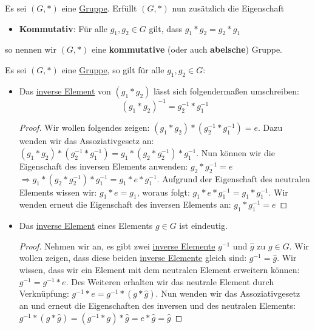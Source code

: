 \documentclass[../../main.tex]{subfiles}
\begin{document}
		\begin{definition}
			\label{def:kommutativeGruppe}
			\label{def:abelscheGruppe}
			Es sei $(G,*)$ eine \hyperref[def:Gruppe]{Gruppe}. Erfüllt $(G,*)$ nun zusätzlich die Eigenschaft 
			\begin{itemize}
				\item \textbf{Kommutativ}: Für alle $g_1,g_2 \in G$ gilt, dass $g_1 * g_2 = g_2 * g_1$
			\end{itemize}
			so nennen wir $(G,*)$ eine \textbf{kommutative} (oder auch \textbf{abelsche}) Gruppe. 
		\end{definition}
	
		\begin{theorem}
			Es sei $(G,*)$ eine \hyperref[def:Gruppe]{Gruppe}, so gilt für alle $g_1,g_2\in G$:
			\begin{itemize}
				\item Das \hyperref[def:inversesElement]{inverse Element} von $(g_1*g_2)$ lässt sich folgendermaßen umschreiben:  $$(g_1*g_2)^{-1}=g_2^{-1}*g_1^{-1}$$
				\begin{proof}
					Wir wollen folgendes zeigen: $(g_1*g_2)*(g_2^{-1}*g_1^{-1})=e$. Dazu wenden wir das Assoziativgesetz an: $(g_1*g_2)*(g_2^{-1}*g_1^{-1})=g_1 * (g_2*g_2^{-1}) * g_1^{-1}$. Nun können wir die Eigenschaft des inversen Elements anwenden: $g_2*g_2^{-1}=e$ $\Rightarrow g_1 * (g_2*g_2^{-1}) * g_1^{-1} = g_1 * e * g_1^{-1}$. Aufgrund der Eigenschaft des neutralen Elements wissen wir: $g_1 * e = g_1$, woraus folgt: $g_1 * e * g_1^{-1} = g_1 * g_1^{-1}$. Wir wenden erneut die Eigenschaft des inversen Elements an: $g_1 * g_1^{-1} = e$
				\end{proof}
				\item Das \hyperref[def:inversesElement]{inverse Element} eines Elements $g \in G$ ist eindeutig.
				\begin{proof}
					Nehmen wir an, es gibt zwei \hyperref[def:inversesElement]{inverse Elemente} $g^{-1}$ und $\hat{g}$ zu $g \in G$. Wir wollen zeigen, dass diese beiden \hyperref[def:inversesElement]{inverse Elemente} gleich sind: $g^{-1} = \hat{g}$. Wir wissen, dass wir ein Element mit dem neutralen Element erweitern können: $g^{-1} = g^{-1} * e$. Des Weiteren erhalten wir das neutrale Element durch Verknüpfung: $g^{-1} * e = g^{-1} * (g * \hat{g})$. Nun wenden wir das Assoziativgesetz an und erneut die Eigenschaften des inversen und des neutralen Elements: $g^{-1} * (g * \hat{g}) = (g^{-1} * g) * \hat{g} = e * \hat{g} = \hat{g}$
				\end{proof}
			\end{itemize}
		\end{theorem}
	
\end{document}
